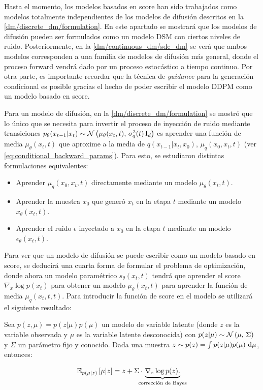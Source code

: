 Hasta el momento, los modelos basados en score han sido trabajados como modelos totalmente independientes de los modelos de difusión descritos en la \autoref{dm/discrete_dm/formulation}. En este apartado se mostrará que los modelos de difusión pueden ser formulados como un modelo DSM con ciertos niveles de ruido. Posteriormente, en la \autoref{dm/continuous_dm/sde_dm} se verá que ambos modelos corresponden a una familia de modelos de difusión más general, donde el proceso forward vendrá dado por un proceso estocástico a tiempo continuo. Por otra parte, es importante recordar que la técnica de \textit{guidance} para la generación condicional es posible gracias el hecho de poder escribir el modelo DDPM como un modelo basado en score.

Para un modelo de difusión, en la \autoref{dm/discrete_dm/formulation} se mostró que lo único que se necesita para invertir el proceso de inyección de ruido mediante transiciones $p_\theta(x_{t-1}|x_t)\sim\mathcal{N}\left(\mu_\theta(x_t,t),\,\sigma_q^2(t)\operatorname{I}_{d}\right)$ es aprender una función de media $\mu_\theta(x_t,t)$ que aproxime a la media de $q(x_{t-1}|x_t,x_0)$, $\mu_q(x_0,x_t,t)$ (ver \eqref{eq:conditional_backward_params}). Para esto, se estudiaron distintas formulaciones equivalentes:

\begin{itemize}
    \item Aprender $\mu_q(x_0,x_t,t)$ directamente mediante un modelo $\mu_\theta(x_t,t)$.
    \item Aprender la muestra $x_0$ que generó $x_t$ en la etapa $t$ mediante un modelo $x_\theta(x_t,t)$.
    \item Aprender el ruido $\epsilon$ inyectado a $x_0$ en la etapa $t$ mediante un modelo $\epsilon_\theta(x_t,t)$.
\end{itemize}

Para ver que un modelo de difusión se puede escribir como un modelo basado en score, se deducirá una cuarta forma de formular el problema de optimización, donde ahora un modelo paramétrico $s_\theta(x_t,t)$ tendrá que aprender el score $\nabla_x\log p(x_t)$ para obtener un modelo $\mu_\theta(x_t,t)$ para aprender la función de media $\mu_q(x_t,t,t)$. Para introducir la función de score en el modelo se utilizará el siguiente resultado:

\begin{teo}
    Sea $p(z,\mu)=p(z|\mu)p(\mu)$ un modelo de variable latente (donde $z$ es la variable observada y $\mu$ es la variable latente desconocida) con $p(z|\mu)\sim\mathcal{N}\left(\mu,\,\Sigma\right)$ y $\Sigma$ un parámetro fijo y conocido. Dada una muestra $z\sim p(z)= \int p(z|\mu) p(\mu)\,\operatorname{d}\!\mu$, entonces:

    \begin{equation*}
        \E{p(\mu|z)}{\mu|z} = z + \Sigma \cdot\hspace{-.3cm} \underbrace{\nabla_z \log p(z).}_{\text{corrección de Bayes}}
    \end{equation*}
\end{teo}

